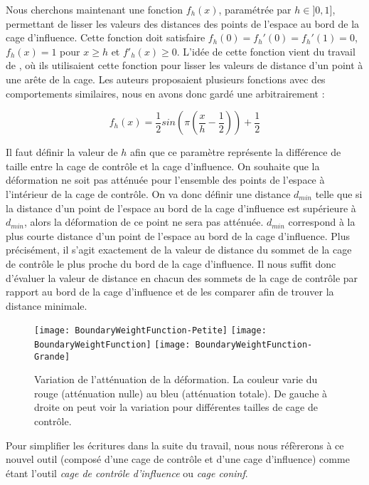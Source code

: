Nous cherchons maintenant une fonction $f_h(x)$, paramétrée par $h \in ]0,
1]$, permettant de lisser les valeurs des distances des points de l'espace au
bord de la cage d'influence. Cette fonction doit satisfaire $f_h(0) = f_h'(0)
= f_h'(1) = 0$, $f_h(x)=1$ pour $x \geq h$ et $f'_h(x) \geq 0$. L'idée de
cette fonction vient du travail de \cite{GPCP13}, où ils utilisaient cette
fonction pour lisser les valeurs de distance d'un point à une arête de la
cage. Les auteurs proposaient plusieurs fonctions avec des comportements
similaires, nous en avons donc gardé une arbitrairement :

\begin{equation}
  f_h(x) = \frac{1}{2} sin(\pi(\frac{x}{h} - \frac{1}{2})) + \frac{1}{2}
\end{equation}

Il faut définir la valeur de $h$ afin que ce paramètre représente la
différence de taille entre la cage de contrôle et la cage d'influence. On
souhaite que la déformation ne soit pas atténuée pour l'ensemble des points de
l'espace à l'intérieur de la cage de contrôle. On va donc définir une distance
$d_{min}$ telle que si la distance d'un point de l'espace au bord de la cage
d'influence est supérieure à $d_{min}$, alors la déformation de ce point ne
sera pas atténuée. $d_{min}$ correspond à la plus courte distance d'un point
de l'espace au bord de la cage d'influence. Plus précisément, il s'agit
exactement de la valeur de distance du sommet de la cage de contrôle le plus
proche du bord de la cage d'influence. Il nous suffit donc d'évaluer la valeur
de distance en chacun des sommets de la cage de contrôle par rapport au bord
de la cage d'influence et de les comparer afin de trouver la distance
minimale.

\begin{figure}[ht]
  \begin{center}
    \texttt{[image: BoundaryWeightFunction-Petite]}
    \texttt{[image: BoundaryWeightFunction]}
    \texttt{[image: BoundaryWeightFunction-Grande]}

    \caption{Variation de l'atténuation de la déformation. La couleur varie du
rouge (atténuation nulle) au bleu (atténuation totale). De gauche à droite on
peut voir la variation pour différentes tailles de cage de contrôle.}

    \label{MELBou}
  \end{center}
\end{figure}

Pour simplifier les écritures dans la suite du travail, nous nous réfèrerons à
ce nouvel outil (composé d'une cage de contrôle et d'une cage d'influence)
comme étant l'outil \textit{cage de contrôle d'influence} ou \textit{cage
coninf}.

